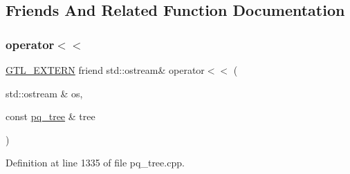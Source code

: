 \subsection{Friends And Related Function Documentation}
\mbox{\label{classp__node_a2db830bf75339bd39c819c231c03769b}} 
\subsubsection{\texorpdfstring{operator$<$$<$}{operator<<}}
{\footnotesize\ttfamily \mbox{\hyperlink{_g_t_l_8h_a014cd1e9b3e67a78ae433eda95c8fd25}{G\+T\+L\+\_\+\+E\+X\+T\+E\+RN}} friend std\+::ostream\& operator$<$$<$ (\begin{DoxyParamCaption}\item[{std\+::ostream \&}]{os,  }\item[{const \mbox{\hyperlink{classpq__tree}{pq\+\_\+tree}} \&}]{tree }\end{DoxyParamCaption})\hspace{0.3cm}{\ttfamily [friend]}}



Definition at line 1335 of file pq\+\_\+tree.\+cpp.


